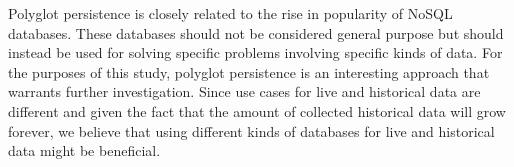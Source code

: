 Polyglot persistence is closely related to the rise in popularity of NoSQL databases. These databases should not be considered general purpose \cite{Catell, polyglotms} but should instead be used for solving specific problems involving specific kinds of data. For the purposes of this study, polyglot persistence is an interesting approach that warrants further investigation. Since use cases for live and historical data are different and given the fact that the amount of collected historical data will grow forever, we believe that using different kinds of databases for live and historical data might be beneficial. 




%
%

